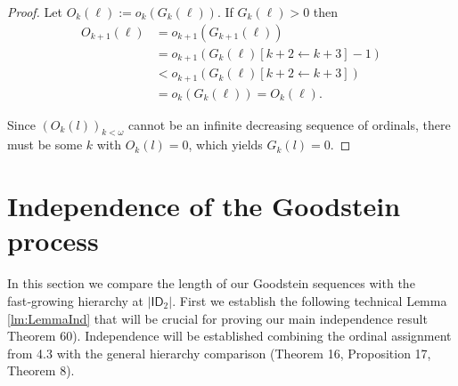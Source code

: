 \documentclass{amsart}
\theoremstyle{plain}
\theoremstyle{plain}
\newcommand{\ID}{\mathsf{ID}}
\newcommand{\okpe}{o_{k+1}}
\newcommand{\ok}{o_{k}}
\newcommand{\om}{\omega}
\begin{document}
\begin{proof}
Let $O_k(\ell) := \ok(G_{k}(\ell))$.
If $G_k(\ell) >0$ then 
\begin{align*}
    O_{k+1}(\ell) &= \okpe(G_{k+1}(\ell)) \\
    &= \okpe(G_k(\ell)[k+2 \leftarrow k+3]-1 ) \\
    &< \okpe (G_k(\ell)[k+2\leftarrow k+3]) \\
    &= \ok(G_k(\ell)) = O_k(\ell).
\end{align*}

Since $(O_k(l))_{k<\om}$ cannot be an infinite decreasing sequence of ordinals, there must be some $k$ with $O_k(l)=0$, which yields $G_k(l)=0$.     
\end{proof}

\section{Independence of the Goodstein process}\label{sec: Indep}
In this section we compare the length of our Goodstein sequences with the fast‑growing hierarchy at $|\ID_2|$. First we establish the following technical Lemma \ref{lm:LemmaInd} that will be crucial for proving our main independence result Theorem 60). Independence will be established combining the ordinal assignment from 4.3 with the general hierarchy comparison (Theorem 16, Proposition 17, Theorem 8).
\end{document}
